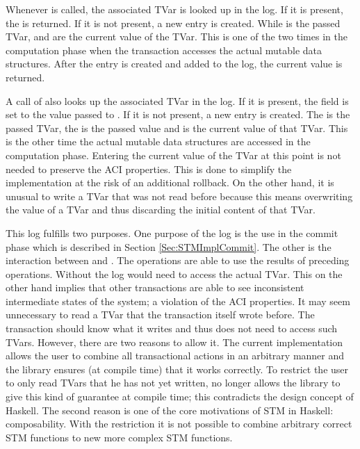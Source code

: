 Whenever  is called, the associated TVar is looked up in the log.
If it is present, the  is returned. If it is not present, a new entry is created. While 
is the passed TVar,  and  are the current value of the TVar.
This is one of the two times in the computation phase when the transaction accesses the actual mutable data structures.  
After the entry is created and added to the log, the current value is returned. 

A call of  also looks up the associated TVar in the log. If it is present, the field  is 
set to the value passed to . If it is not present, a new entry is created. The  is the passed TVar,
the  is the passed value and  is the current value of that TVar. This is the other time 
the actual mutable data structures are accessed in the computation phase. Entering the current value of the TVar at this
point is not needed to preserve the ACI properties. This is done to simplify the implementation at the risk of an additional
rollback. On the other hand, it is unusual to write a TVar that was not read before because this means overwriting the 
value of a TVar and thus discarding the initial content of that TVar.

This log fulfills two purposes. One purpose of the log is the use in the commit phase which is described in Section \ref{Sec:STMImplCommit}.
The other is the interaction between  and . The  operations are able to use the results 
of preceding  operations. Without the log  would need to access the actual TVar. This on the 
other hand implies that other transactions are able to see inconsistent intermediate states of the system;
a violation of the ACI properties. It may seem unnecessary to read a TVar that the transaction itself wrote before.
The transaction should know what it writes and thus does not need to access such TVars. However, there are two reasons 
to allow it. The current implementation allows the user to combine all transactional actions in an arbitrary manner and 
the library ensures (at compile time) that it works correctly. To restrict the user to only read TVars that he has
not yet written, no longer allows the library to give this kind of guarantee at compile time; this contradicts
the design concept of Haskell. The second reason is one of the core motivations of STM in Haskell: composability.
With the restriction it is not possible to combine arbitrary correct STM functions to new more complex STM
functions. 

